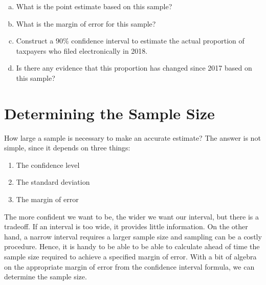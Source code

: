 \documentclass[12pt, letterpaper]{article}
\theoremstyle{definition}
\begin{document}
\vfill

\begin{enumerate}[(a)]

\item What is the point estimate based on this sample?

\vfill

\item What is the margin of error for this sample?

\vfill
\vfill

\item Construct a $90\%$ confidence interval to estimate the actual proportion of taxpayers who filed electronically in 2018.

\vfill
\vfill

\item Is there any evidence that this proportion has changed since 2017 based on this sample?

\vfill
\vfill

\end{enumerate}


\newpage

\section*{Determining the Sample Size}

\noindent How large a sample is necessary to make an accurate estimate?  The answer is not simple, since it depends on three things:
\begin{enumerate}
\item The confidence level
\item The standard deviation
\item The margin of error
\end{enumerate}


\noindent The more confident we want to be, the wider we want our interval, but there is a tradeoff.  If an interval is too wide, it provides little information.  On the other hand, a narrow interval requires a larger sample size and sampling can be a costly procedure.  Hence, it is handy to be able to be able to calculate ahead of time the sample size required to achieve a specified margin of error.  With a bit of algebra on the appropriate margin of error from the confidence interval formula, we can determine the sample size.
\end{document}

